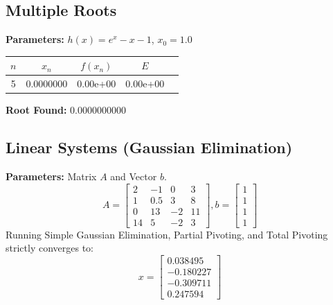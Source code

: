 \documentclass[12pt,a4paper]{article}
\begin{document}
\subsection{Multiple Roots}
\textbf{Parameters:} $h(x) = e^x - x - 1$, $x_0 = 1.0$
\begin{center}
\begin{tabular}{c c c c c}
\toprule
$n$ & $x_n$ & $f(x_n)$ & $E$ \\
\midrule
5 & 0.0000000 & 0.00e+00 & 0.00e+00 \\
\bottomrule
\end{tabular}
\end{center}
\textbf{Root Found:} 0.0000000000

\subsection{Linear Systems (Gaussian Elimination)}
\textbf{Parameters:} Matrix $A$ and Vector $b$.
\[
A = \begin{bmatrix}
2 & -1 & 0 & 3 \\
1 & 0.5 & 3 & 8 \\
0 & 13 & -2 & 11 \\
14 & 5 & -2 & 3 
\end{bmatrix}, 
b = \begin{bmatrix} 1 \\ 1 \\ 1 \\ 1 \end{bmatrix}
\]
Running Simple Gaussian Elimination, Partial Pivoting, and Total Pivoting strictly converges to:
\[
x = \begin{bmatrix} 0.038495 \\ -0.180227 \\ -0.309711 \\ 0.247594 \end{bmatrix}
\]
\end{document}
